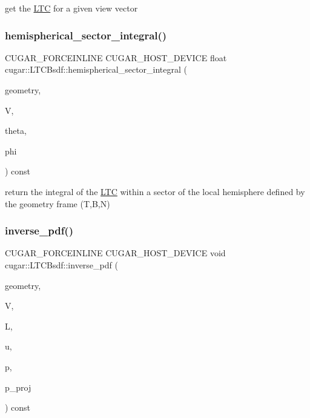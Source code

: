 get the \hyperlink{structcugar_1_1_l_t_c_bsdf_1_1_l_t_c}{L\+TC} for a given view vector \mbox{\label{structcugar_1_1_l_t_c_bsdf_a091fd533ea3fe05f3f1fd915305a30b3}} 
\subsubsection{\texorpdfstring{hemispherical\+\_\+sector\+\_\+integral()}{hemispherical\_sector\_integral()}}
{\footnotesize\ttfamily C\+U\+G\+A\+R\+\_\+\+F\+O\+R\+C\+E\+I\+N\+L\+I\+NE C\+U\+G\+A\+R\+\_\+\+H\+O\+S\+T\+\_\+\+D\+E\+V\+I\+CE float cugar\+::\+L\+T\+C\+Bsdf\+::hemispherical\+\_\+sector\+\_\+integral (\begin{DoxyParamCaption}\item[{const \hyperlink{structcugar_1_1_differential_geometry}{Differential\+Geometry} \&}]{geometry,  }\item[{const \hyperlink{structcugar_1_1_vector}{Vector3f}}]{V,  }\item[{const float2}]{theta,  }\item[{const float2}]{phi }\end{DoxyParamCaption}) const\hspace{0.3cm}{\ttfamily [inline]}}

return the integral of the \hyperlink{structcugar_1_1_l_t_c_bsdf_1_1_l_t_c}{L\+TC} within a sector of the local hemisphere defined by the geometry frame (T,B,N) \mbox{\label{structcugar_1_1_l_t_c_bsdf_a738943bbfae195948389c33804e18ab2}} 
\subsubsection{\texorpdfstring{inverse\+\_\+pdf()}{inverse\_pdf()}}
{\footnotesize\ttfamily C\+U\+G\+A\+R\+\_\+\+F\+O\+R\+C\+E\+I\+N\+L\+I\+NE C\+U\+G\+A\+R\+\_\+\+H\+O\+S\+T\+\_\+\+D\+E\+V\+I\+CE void cugar\+::\+L\+T\+C\+Bsdf\+::inverse\+\_\+pdf (\begin{DoxyParamCaption}\item[{const \hyperlink{structcugar_1_1_differential_geometry}{Differential\+Geometry} \&}]{geometry,  }\item[{const \hyperlink{structcugar_1_1_vector}{Vector3f}}]{V,  }\item[{const \hyperlink{structcugar_1_1_vector}{Vector3f}}]{L,  }\item[{const \hyperlink{structcugar_1_1_vector}{Vector3f}}]{u,  }\item[{float \&}]{p,  }\item[{float \&}]{p\+\_\+proj }\end{DoxyParamCaption}) const\hspace{0.3cm}{\ttfamily [inline]}}

